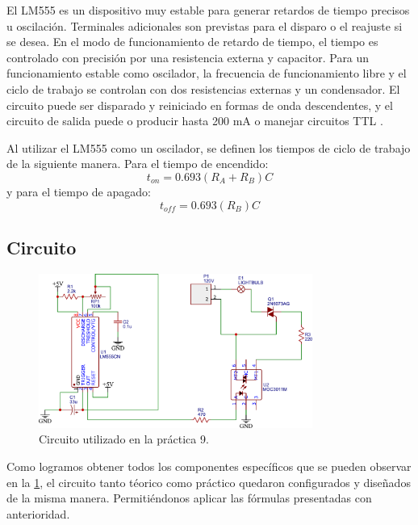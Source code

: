 El LM555 es un dispositivo muy estable para generar retardos de tiempo precisos u oscilación. Terminales adicionales son previstas para el disparo o el reajuste si se desea. En el modo de funcionamiento de retardo de tiempo, el tiempo es controlado con precisión por una resistencia externa y capacitor. Para un funcionamiento estable como oscilador, la frecuencia de funcionamiento libre y el ciclo de trabajo se controlan con dos resistencias externas y un condensador. El circuito puede ser disparado y reiniciado en formas de onda descendentes, y el circuito de salida puede o producir hasta 200 mA o manejar circuitos TTL \parencite{texas_instruments_lm555_2015}.

Al utilizar el LM555 como un oscilador, se definen los tiempos de ciclo de trabajo de la siguiente manera. Para el tiempo de encendido:
\begin{equation}
    t_{on} = 0.693(R_A + R_B)C
\end{equation}
y para el tiempo de apagado:
\begin{equation}
    t_{off} = 0.693(R_B)C
\end{equation}

\subsection{Circuito}

\begin{figure}[htb]
    \centering
    \includegraphics[width=0.8\textwidth]{media/circuito_09}
    \caption{Circuito utilizado en la práctica 9.}
    \label{Fig: Circuito utilizado en la practica 9}
\end{figure}

Como logramos obtener todos los componentes específicos que se pueden observar en la \cref{Fig: Circuito utilizado en la practica 9}, el circuito tanto téorico como práctico quedaron configurados y diseñados de la misma manera. Permitiéndonos aplicar las fórmulas presentadas con anterioridad.

